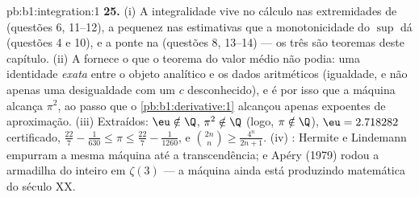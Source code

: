\begin{solution}{pb:b1:integration:1}
\textbf{25.} (i) A integralidade vive no cálculo nas extremidades de
 (questões 6, 11--12), a pequenez nas estimativas que a
monotonicidade do $\sup$ dá (questões 4 e 10), e a ponte na
 (questões 8, 13--14) --- os três são
teoremas deste capítulo. (ii) A  fornece o que o
teorema do valor médio não podia: uma identidade \emph{exata} entre
o objeto analítico e os dados aritméticos (igualdade, e não apenas
uma desigualdade com um $c$ desconhecido), e é por isso que a máquina
alcança $\pi^2$, ao passo que o \cref{pb:b1:derivative:1} alcançou apenas
expoentes de aproximação. (iii) Extraídos: $\eu \notin \Q$,
$\pi^2 \notin \Q$ (logo, $\pi \notin \Q$), $\eu = 2.718282$
certificado, $\frac{22}{7} - \frac{1}{630} \leq \pi \leq
\frac{22}{7} - \frac{1}{1260}$, e $\binom{2n}{n} \geq
\frac{4^n}{2n+1}$. (iv) : Hermite e Lindemann empurram
a mesma máquina até a transcendência; e Apéry (1979) rodou a
armadilha do inteiro em $\zeta(3)$ --- a máquina ainda está produzindo
matemática do século XX.
\end{solution}
